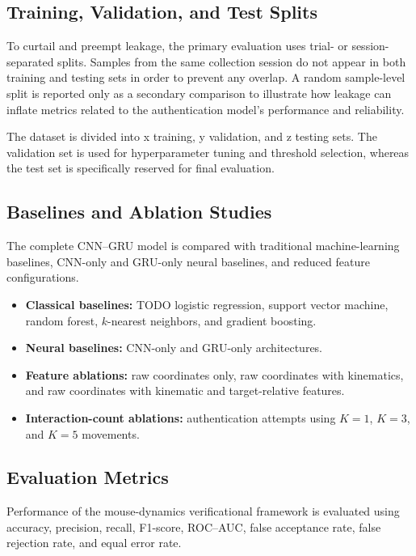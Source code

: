 \documentclass[conference]{IEEEtran}
\begin{document}
\subsection{Training, Validation, and Test Splits}

To curtail and preempt leakage, the primary evaluation uses trial- or session-separated splits. Samples from the same collection session do not appear in both training and testing sets in order to prevent any overlap. A random sample-level split is reported only as a secondary comparison to illustrate how leakage can inflate metrics related to the authentication model's performance and reliability. 


The dataset is divided into x training, y validation, and z testing sets. The validation set is used for hyperparameter tuning and threshold selection, whereas the test set is specifically reserved for final evaluation. 

\subsection{Baselines and Ablation Studies}

The complete CNN--GRU model is compared with traditional machine-learning baselines, CNN-only and GRU-only neural baselines, and reduced feature configurations. 

\begin{itemize}
    \item \textbf{Classical baselines:} TODO logistic regression, support vector machine, random forest, $k$-nearest neighbors, and gradient boosting. 
    \item \textbf{Neural baselines:} CNN-only and GRU-only architectures.
    \item \textbf{Feature ablations:} raw coordinates only, raw coordinates with kinematics, and raw coordinates with kinematic and target-relative features.
    \item \textbf{Interaction-count ablations:} authentication attempts using $K=1$, $K=3$, and $K=5$ movements. 
\end{itemize}

\subsection{Evaluation Metrics}

Performance of the mouse-dynamics verificational framework is evaluated using accuracy, precision, recall, F1-score, ROC--AUC, false acceptance rate, false rejection rate, and equal error rate. 
\end{document}
